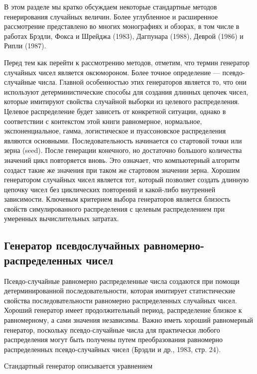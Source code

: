 В этом разделе мы кратко обсуждаем некоторые стандартные методов генерирования случайных величин. Более углубленное и расширенное рассмотрение представлено во многих монографиях и обзорах, в том числе в работах Брэдли, Фокса и Шрейджа (1983), Дагпунара (1988), Деврой (1986) и Рипли (1987).


Перед тем как перейти к рассмотрению методов, отметим, что термин генератор случайных чисел является оксюмороном. Более точное определение --- псевдо-случайные числа. Главной особенностью этих генераторов является то, что они используют детерминистические способы для создания длинных цепочек чисел, которые имитируют свойства случайной выборки из целевого распределения. Целевое распределение будет зависеть от конкретной ситуации, однако в соответствии с контекстом этой книги равномерное, нормальное, экспоненциальное, гамма, логистическое и пуассоновское распределения являются основными. Последовательность начинается со стартовой точки или зерна (seed). После генерации конечного, но достаточно большого количества значений цикл повторяется вновь. Это означает, что компьютерный алгоритм создаст такие же значения при таком же стартовом значении зерна. Хорошим генератором случайных чисел является тот, который позволяет создать длинную цепочку чисел без циклических повторений и какой-либо внутренней зависимости. Ключевым критерием выбора генераторов является близость свойств симулированного распределения с целевым распределением при умеренных вычислительных затратах.

\subsection{Генератор псевдослучайных равномерно-распределенных чисел}

Псевдо-случайные равномерно распределенные числа создаются при помощи детерминированной последовательности, которая имитирует статистические свойства последовательности равномерно распределенных случайных чисел. Хороший генератор имеет продолжительный период, распределение близкое к равномерному, а сами значения независимы. Важно иметь  хороший равномерный генератор, поскольку псевдо-случайные числа для практически любого распределения могут быть получены путем преобразования равномерно распределенных псевдо-случайных чисел  (Брэдли и др., 1983, стр. 24).

Стандартный генератор описывается уравнением

